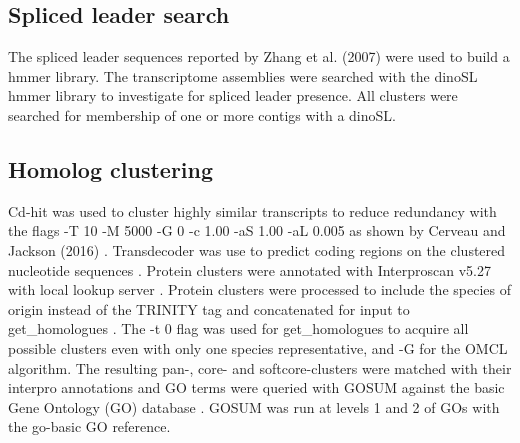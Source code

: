 \documentclass[12pt]{article}
\begin{document}


\subsection*{Spliced leader search}
The spliced leader sequences reported by Zhang et al. (2007) were used to build a hmmer library. 
The transcriptome assemblies were searched with the dinoSL hmmer library to investigate for spliced leader presence. 
All clusters were searched for membership of one or more contigs with a dinoSL.

\subsection*{Homolog clustering}
Cd-hit was used to cluster highly similar transcripts to reduce redundancy with the flags -T 10 -M 5000 -G 0 -c 1.00 -aS 1.00 -aL 0.005 as shown by Cerveau and Jackson (2016) \cite{cerveau2016combining,fu2012cd}. 
Transdecoder was use to predict coding regions on the clustered nucleotide sequences \cite{haas2016transdecoder}.
Protein clusters were annotated with Interproscan v5.27 with local lookup server \cite{quevillon2005interproscan}.
Protein clusters were processed to include the species of origin instead of the TRINITY tag and concatenated for input to get\_homologues \cite{vinuesa2015robust}. 
The -t 0 flag was used for get\_homologues to acquire all possible clusters even with only one species representative, and -G for the OMCL algorithm. 
The resulting pan-, core- and softcore-clusters were matched with their interpro annotations and GO terms were queried with GOSUM against the basic Gene Ontology (GO) database \cite{timgosum,ashburner2000gene,gene2016expansion}. 
GOSUM was run at levels 1 and 2 of GOs with the go-basic GO reference. 
\end{document}
